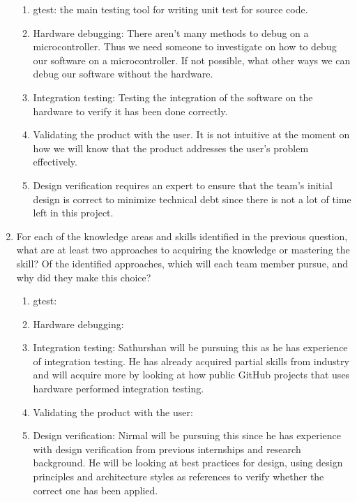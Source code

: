 \documentclass[12pt, titlepage]{article}
\begin{document}
\begin{enumerate}
  \begin{enumerate}
    \item gtest: the main testing tool for writing unit test for source code.
    \item Hardware debugging: There aren't many methods to debug on a
    microcontroller. Thus we need someone to investigate on how to debug our
    software on a microcontroller. If not possible, what other ways we can debug
    our software without the hardware.
    \item Integration testing: Testing the integration of the software on the
    hardware to verify it has been done correctly.
    \item Validating the product with the user. It is not intuitive at the
    moment on how we will know that the product addresses the user's problem
    effectively.
    \item Design verification requires an expert to ensure that the team's
    initial design is correct to minimize technical debt since there is not
    a lot of time left in this project.
  \end{enumerate}

  \item For each of the knowledge areas and skills identified in the previous
  question, what are at least two approaches to acquiring the knowledge or
  mastering the skill?  Of the identified approaches, which will each team
  member pursue, and why did they make this choice?

  \begin{enumerate}
    \item gtest:
    \item Hardware debugging: 
    \item Integration testing: Sathurshan will be pursuing this as he has
    experience of integration testing. He has already acquired partial skills
    from industry and will acquire more by looking at how public GitHub projects
    that uses hardware performed integration testing.
    \item Validating the product with the user:
    \item Design verification: Nirmal will be pursuing this since he has 
    experience with design verification from previous internships and research 
    background. He will be looking at best practices for design, using design 
    principles and architecture styles as references to verify whether the 
    correct one has been applied. 
  \end{enumerate}
\end{enumerate}
\end{document}
